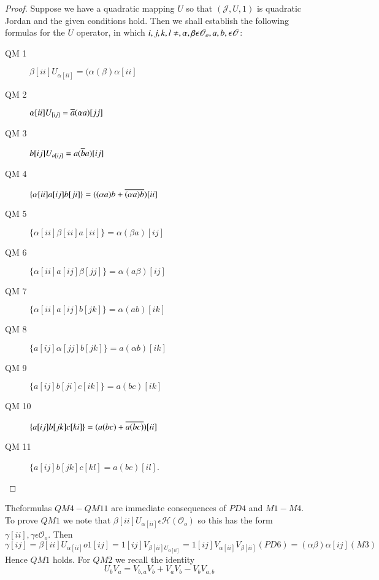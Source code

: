 \begin{proof}
  Suppose we have a quadratic mapping $U$ so that $(\mathscr{J},U,1)$ is
  quadratic Jordan and the given conditions hold. Then we shall
  establish the following formulas for the $U$ operator, in which
  $i,j,k,l\neq, \alpha, \beta\epsilon \mathscr{O}_o,\break
  a,b,\epsilon \mathscr{O}$: 
  
  \begin{description}
  \item[QM 1] $\beta[ii]U_{\alpha[ii]}=(\alpha(\beta)\alpha[ii]$
    
  \item[QM 2] $\alpha[ii] U_{[ij]}=\overline{a}(\alpha a)[jj]$
    
  \item[QM 3] $b[ij]U_{a[ij]}=a(\overline{b}a)[ij]$
    
  \item[QM 4] $\{\alpha[ii] a[ij]b[ji]\}=((\alpha a)b+\overline{(\alpha
    a)b})[ii]$
    
  \item[QM 5] $\{\alpha[ii]\beta[ii]a[ii]\}=\alpha(\beta a)[ij]$
    
  \item[QM 6] $\{\alpha[ii] a[ij]\beta[jj]\}=\alpha(a\beta)[ij]$
    
  \item[QM 7] $\{\alpha[ii]a[ij]b[jk]\}=\alpha(ab)[ik]$
    
  \item[QM 8] $\{a[ij]\alpha[jj]b[jk]\}=a(\alpha b)[ik]$
    
  \item[QM 9] $\{a[ij] b[ji] c[ik]\}=a(bc)[ik]$
    
  \item[QM 10] $\{a[ij]b[jk]c[ki]\}=(a(bc)+\overline{a(bc)})[ii]$
    
  \item[QM 11] $\{a[ij] b[jk]c[kl]=a(bc)[il]$.
  \end{description}
\end{proof}

The\pageoriginale formulas $QM 4- QM 11$ are immediate consequences of
$PD 4$ and $M1-M4$. To prove $QM 1$ we note that
$\beta[ii]U_{\alpha[ii]}\epsilon \mathscr{H}(\mathscr{O}_o)$ so this
has the form $\gamma[ii], \gamma\epsilon \mathscr{O}_o$. Then
$\gamma[ij]=\beta[ii]U_{\alpha[ii]}o1[ij] =
1[ij]V_{\beta[ii]U_{\alpha[ii]}} = 1[ij]V_{\alpha[ii]}V_{\beta[ii]}(PD 
6)=(\alpha \beta)\alpha[ij](M3)$ Hence $QM 1$ holds. For $QM 2$ we
recall the identity
\begin{equation*}
  U_bV_a=V_{b,a}V_b+V_aV_b-V_bV_{a,b}\tag{QJ 18}
\end{equation*}

